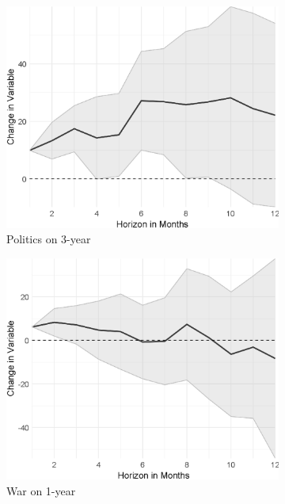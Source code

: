 \begin{figure}[H]
\begin{subfigure}{00.32\textwidth}
	\includegraphics[width=1\textwidth]{output/lp/baseline/level/politics/politicsonexpectations3y_djn.eps}
	\caption{Politics on 3-year}
\end{subfigure}
\begin{subfigure}{00.32\textwidth}
	\includegraphics[width=1\textwidth]{output/lp/baseline/level/war/waronexpectations1y_djn.eps}
	\caption{War on 1-year}
\end{subfigure}
\begin{subfigure}{00.32\textwidth}

\end{subfigure}
\end{figure}

